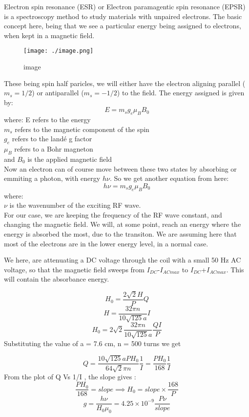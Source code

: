 \documentclass{ieeeconf}
\begin{document}
Electron spin resonance (ESR) or Electron paramagentic spin resonance (EPSR) is a spectroscopy method to study materials with unpaired electrons. The basic concept here, being that we see a particular energy being assigned to electrons, when kept in a magnetic field.
\begin{figure}[H]
\centering
\texttt{[image: ./image.png]}
\caption{image}
\label{fig:"image"}
\end{figure}
These being spin half paricles, we will either have the electron aligning parallel (\(m_s = 1/2\)) or antiparallel (\(m_s = -1/2\)) to the field. The energy assigned is given by:
\[ E = m_s g_e \mu_B B_0 \]
where:
E refers to the energy\\
\(m_s\) refers to the magnetic component of the spin\\
\(g_e\) refers to the landé g factor\\
\(\mu_B\) refers to a Bohr magneton\\
and \(B_0\) is the applied magnetic field\\
Now an electron can of course move between these two states by absorbing or emmiting a photon, with energy \(h\nu\). So we get another equation from here:\\
\[ h\nu=m_s g_e \mu_B B_0 \]
where:\\
\(\nu\) is the wavenumber of the exciting RF wave.\\
For our case, we are keeping the frequency of the RF wave constant, and changing the magnetic field. We will, at some point, reach an energy where the energy is absorbed the most, due to the transiton. We are assuming here that most of the electrons are in the lower energy level, in a normal case.

We here, are attenuating a DC voltage through the coil with a small 50 Hz AC voltage, so that the magnetic field sweeps from \(I_{DC}\)-\(I_{AC max}\) to \(I_{DC}\)+\(I_{AC max}\). This will contain the absorbance energy.

\[ H_0 = \frac{2\sqrt{2}H}{P}Q \]
\[ H=\frac{32\pi n}{10\sqrt{125}a}I \]
\[ H_0=2\sqrt{2}\frac{32\pi n}{10\sqrt{125}a}\frac{QI}{P} \]
Substituting the value of a = 7.6 cm, n = 500 turns we get

\begin{equation} Q=\frac{10\sqrt{125}a PH_0}{64\sqrt{2}\pi n }\frac{1}{I}=\frac{PH_0}{168}\frac{1}{I} \label{eq:desc}\end{equation}
From the plot of Q Vs 1/I , the slope gives :
\[ \frac{PH_0}{168}=slope \implies H_0=slope \times \frac{168}{P} \]
\[ g=\frac{h \nu}{H_0 \mu_0} = 4.25\times10^{-9} \frac{P \nu}{slope} \]
\end{document}
